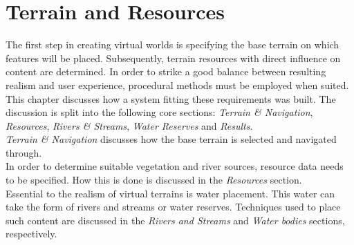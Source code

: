 \chapter{Terrain and Resources} \label{chap:terrain_and_resources}

The first step in creating virtual worlds is specifying the base terrain on which features will be placed. Subsequently, terrain resources with direct influence on content are determined. In order to strike a good balance between resulting realism and user experience, procedural methods must be employed when suited.\\
This chapter discusses how a system fitting these requirements was built. The discussion is split into the following core sections: \textit{Terrain \& Navigation}, \textit{Resources}, \textit{Rivers \& Streams}, \textit{Water Reserves} and \textit{Results}.\\
\textit{Terrain \& Navigation} discusses how the base terrain is selected and navigated through. \\
In order to determine suitable vegetation and river sources, resource data needs to be specified. How this is done is discussed in the \textit{Resources} section.\\
Essential to the realism of virtual terrains is water placement. This water can take the form of rivers and streams or water reserves. Techniques used to place such content are discussed in the \textit{Rivers and Streams} and \textit{Water bodies} sections, respectively. \\

